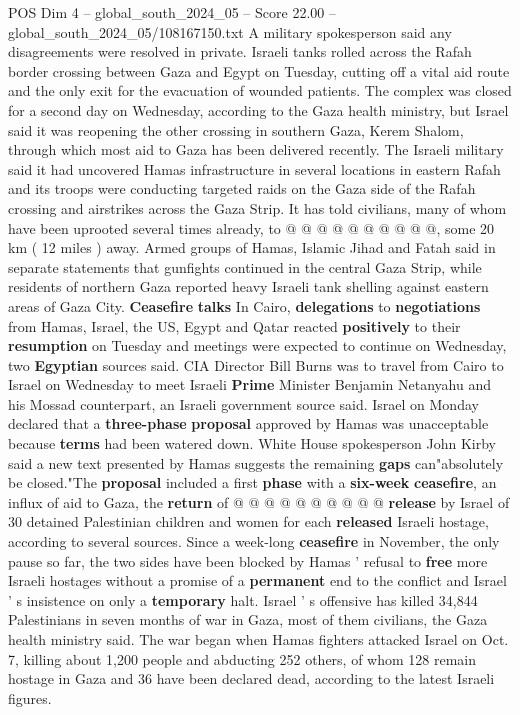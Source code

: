 \begin{textsample}{POS Dim 4 – global\_south\_2024\_05 – Score 22.00 – global\_south\_2024\_05/108167150.txt}
A military spokesperson said any disagreements were resolved in private.
Israeli tanks rolled across the Rafah border crossing between Gaza and Egypt on Tuesday, cutting off a vital aid route and the only exit for the evacuation of wounded patients.
The complex was closed for a second day on Wednesday, according to the Gaza health ministry, but Israel said it was reopening the other crossing in southern Gaza, Kerem Shalom, through which most aid to Gaza has been delivered recently.
The Israeli military said it had uncovered Hamas infrastructure in several locations in eastern Rafah and its troops were conducting targeted raids on the Gaza side of the Rafah crossing and airstrikes across the Gaza Strip.
It has told civilians, many of whom have been uprooted several times already, to @ @ @ @ @ @ @ @ @ @, some 20 km ( 12 miles ) away.
Armed groups of Hamas, Islamic Jihad and Fatah said in separate statements that gunfights continued in the central Gaza Strip, while residents of northern Gaza reported heavy Israeli tank shelling against eastern areas of Gaza City. \textbf{Ceasefire} \textbf{talks} In Cairo, \textbf{delegations} to \textbf{negotiations} from Hamas, Israel, the US, Egypt and Qatar reacted \textbf{positively} to their \textbf{resumption} on Tuesday and meetings were expected to continue on Wednesday, two \textbf{Egyptian} sources said.
CIA Director Bill Burns was to travel from Cairo to Israel on Wednesday to meet Israeli \textbf{Prime} Minister Benjamin Netanyahu and his Mossad counterpart, an Israeli government source said.
Israel on Monday declared that a \textbf{three-phase} \textbf{proposal} approved by Hamas was unacceptable because \textbf{terms} had been watered down.
White House spokesperson John Kirby said a new text presented by Hamas suggests the remaining \textbf{gaps} can"absolutely be closed."The \textbf{proposal} included a first \textbf{phase} with a \textbf{six-week} \textbf{ceasefire}, an influx of aid to Gaza, the \textbf{return} of @ @ @ @ @ @ @ @ @ @ \textbf{release} by Israel of 30 detained Palestinian children and women for each \textbf{released} Israeli hostage, according to several sources.
Since a week-long \textbf{ceasefire} in November, the only pause so far, the two sides have been blocked by Hamas ' refusal to \textbf{free} more Israeli hostages without a promise of a \textbf{permanent} end to the conflict and Israel ' s insistence on only a \textbf{temporary} halt.
Israel ' s offensive has killed 34,844 Palestinians in seven months of war in Gaza, most of them civilians, the Gaza health ministry said.
The war began when Hamas fighters attacked Israel on Oct. 7, killing about 1,200 people and abducting 252 others, of whom 128 remain hostage in Gaza and 36 have been declared dead, according to the latest Israeli figures.

\end{textsample}
